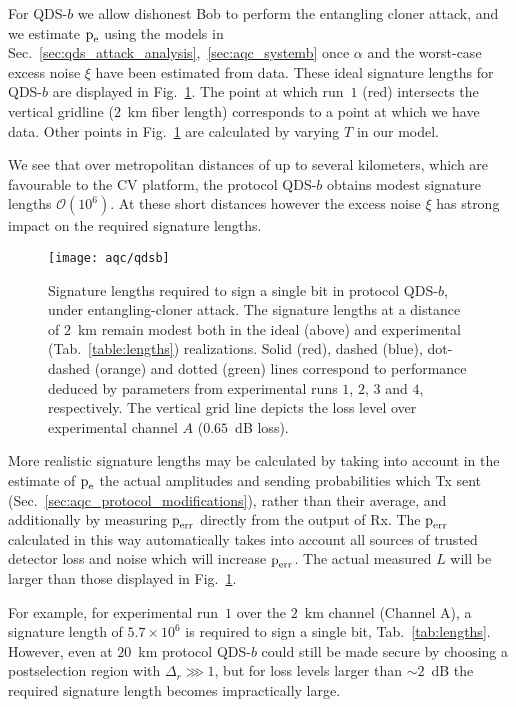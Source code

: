 For QDS-$b$ we allow dishonest Bob to perform the entangling cloner attack, and we estimate $\text{p}_{\text{e}}$ using the models in Sec.~\ref{sec:qds_attack_analysis},~\ref{sec:aqc_systemb} once $\alpha$ and the worst-case excess noise $\xi$ have been estimated from data. These ideal signature lengths for QDS-$b$ are displayed in Fig.~\ref{fig:aqc_qdsb}. The point at which run~$1$ (red) intersects the vertical gridline ($2$~km fiber length) corresponds to a point at which we have data. Other points in Fig.~\ref{fig:aqc_qdsb} are calculated by varying $T$ in our model.

We see that over metropolitan distances of up to several kilometers, which are favourable to the CV platform, the protocol QDS-$b$ obtains modest signature lengths $\mathcal{O}\left(10^6\right)$. At these short distances however the excess noise $\xi$ has strong impact on the required signature lengths.

\begin{figure}[htp]
\captionsetup{width=0.8\linewidth}
\centering
\texttt{[image: aqc/qdsb]}
\caption{\label{fig:aqc_qdsb} Signature lengths required to sign a single bit in protocol QDS-$b$, under entangling-cloner attack. The signature lengths at a distance of $2$~km remain modest both in the ideal (above) and experimental (Tab.~\ref{table:lengths}) realizations. %
Solid (red), dashed (blue), dot-dashed (orange) and dotted (green) lines correspond to performance deduced by parameters from experimental runs $1$, $2$, $3$ and $4$, respectively. The vertical grid line depicts the loss level over experimental channel $A$ ($0.65$~dB loss).}
\end{figure} %

More realistic signature lengths may be calculated by taking into account in the estimate of $\text{p}_{\text{e}}$ the actual amplitudes and sending probabilities which Tx sent (Sec.~\ref{sec:aqc_protocol_modifications}), rather than their average, and additionally by measuring $\text{p}_{\text{err}}$ directly from the output of Rx. The $\text{p}_{\text{err}}$ calculated in this way automatically takes into account all sources of trusted detector loss and noise which will increase $\text{p}_{\text{err}}$. The actual measured $L$ will be larger than those displayed in Fig.~\ref{fig:aqc_qdsb}. 

For example, for experimental run~$1$ over the $2$~km channel (Channel A), a signature length of $5.7 \times 10^6$ is required to sign a single bit, Tab.~\ref{tab:lengths}. However, even at $20$~km protocol QDS-$b$ could still be made secure by choosing a postselection region with $\Delta_r \ggg 1$, but for loss levels larger than $\sim 2$~dB the required signature length becomes impractically large.

